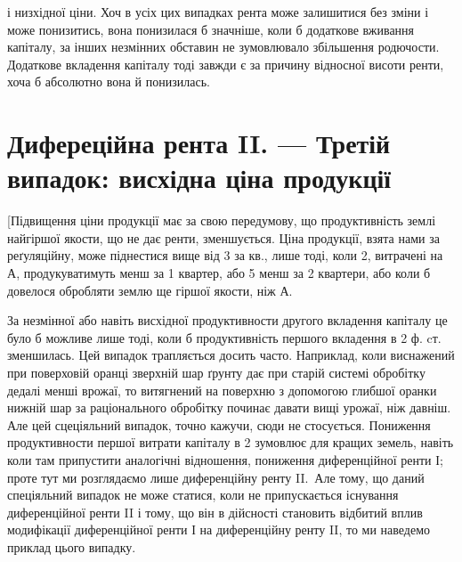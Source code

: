 \parcont{}  %
і низхідної ціни. Хоч в усіх цих випадках рента може залишитися без зміни
і може понизитись, вона понизилася б значніше, коли б додаткове вживання
капіталу, за інших незмінних обставин не зумовлювало збільшення родючости. Додаткове вкладення
капіталу тоді завжди є за причину відносної висоти ренти,
хоча б абсолютно вона й понизилась.

\section{Дифереційна рента II. — Третій випадок:
висхідна ціна продукції}

[Підвищення ціни продукції має за свою передумову, що продуктивність землі
найгіршої якости, що не дає ренти, зменшується. Ціна продукції, взята нами за
реґуляційну, може піднестися вище від 3 за кв., лише тоді, коли 2,
витрачені на $А$, продукуватимуть менш за 1 квартер, або 5 менш за
2 квартери, або коли б довелося обробляти землю ще гіршої якости, ніж $А$.

За незмінної або навіть висхідної продуктивности другого вкладення капіталу
це було б можливе лише тоді, коли б продуктивність першого вкладення в 2 ф. cт.
зменшилась. Цей випадок трапляється досить часто. Наприклад, коли виснажений
при поверховій оранці зверхній шар ґрунту дає при старій системі обробітку
дедалі менші врожаї, то витягнений на поверхню з допомогою глибшої
оранки нижній шар за раціонального обробітку починає давати вищі
урожаї, ніж давніш. Але цей сцеціяльний випадок, точно кажучи, сюди не
стосується. Пониження продуктивности першої витрати капіталу в 2 зумовлює для кращих
земель, навіть коли там припустити аналогічні відношення,
пониження диференційної ренти І; проте тут ми розглядаємо лише диференційну
ренту II.~Але тому, що даний спеціяльний випадок не може статися, коли не
припускається існування диференційної ренти II і тому, що він в дійсності
становить відбитий вплив модифікації диференційної ренти І на диференційну
ренту II, то ми наведемо приклад цього випадку.


